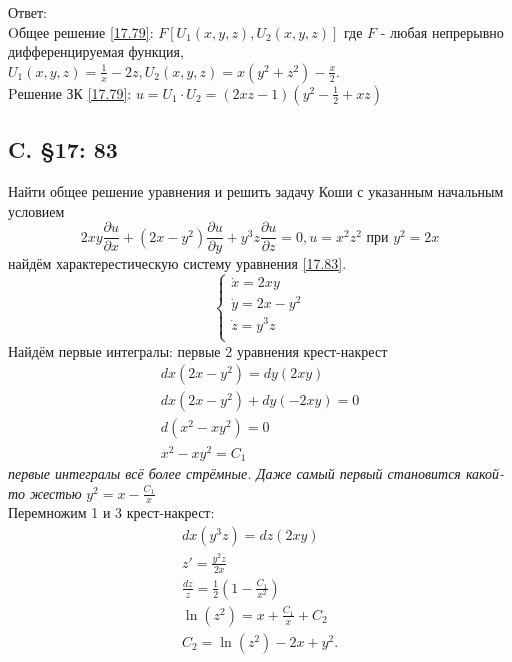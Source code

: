 \documentclass{article}
\begin{document}
Ответ:\\
 Oбщее решение \ref{17.79}: $F[U_1(x,y,z),U_2(x,y,z)]$ где $F$ - любая непрерывно дифференцируемая функция, $U_1(x,y,z)=\frac{1}{x} - 2z, U_2(x,y,z)= x(y^2+z^2)-\frac{x}{2}$.\\
 Pешение ЗК \ref{17.79}: $u=U_1 \cdot U_2 = (2 x z-1)\left(y^{2}-\frac{1}{2}+x z\right)$
\subsection{C. \S17: 83}
Найти общее решение уравнения и решить задачу Коши с указанным
начальным условием
\begin{equation}\label{17.83}
2 x y \frac{\partial u}{\partial x}+\left(2 x-y^{2}\right) \frac{\partial u}{\partial y}+y^{3} z \frac{\partial u}{\partial z}=0, u=x^{2} z^{2} \text { при } y^{2}=2 x
\end{equation}
найдём характерестическую систему уравнения \ref{17.83}.
\begin{equation*}
    \begin{cases}
        \dot x = 2xy \\
        \dot y = 2 x-y^{2}\\
        \dot z = y^{3} z \\
    \end{cases}
\end{equation*}
Найдём первые интегралы: первые 2 уравнения крест-накрест
\begin{gather*}
    dx(2x-y^2)=dy(2xy)\\
    dx(2x-y^2)+dy(-2xy)=0\\
    d(x^2-xy^2)=0\\
    x^2-xy^2=C_1
\end{gather*}
 \textcolor[rgb]{0.480469,0.566406,0.480469}{\textit{первые интегралы всё более стрёмные. Даже самый первый становится какой-то жестью}} 
$y^2=x- \frac{C_1}{x}$\\
Перемножим 1 и 3 крест-накрест:
\begin{gather*}
    dx(y^3z)=dz(2xy)\\
    z'=\frac{y^2z}{2x}\\
    \frac{dz}{z}=\frac{1}{2}(1- \frac{C_1}{x^2})\\
    \ln (z^2) = x + \frac{C_1}{x} + C_2\\
    C_2 = \ln (z^2) - 2x + y^2. 
\end{gather*}
\end{document}
